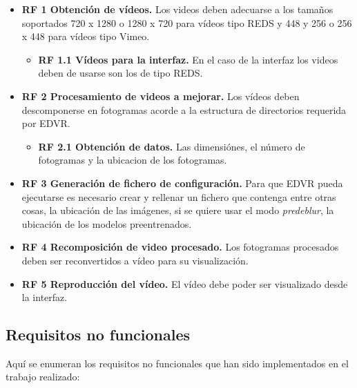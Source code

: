 \begin{itemize}

\item \textbf{RF 1 Obtención de vídeos.} Los videos deben adecuarse a los tamaños soportados 720 x 1280 o  1280 x  720 para vídeos tipo REDS y 448 y 256 o 256 x 448 para vídeos tipo Vimeo.
	\begin{itemize}
    \item \textbf{RF 1.1 Vídeos para la interfaz.} En el caso de la interfaz los videos deben de usarse son los de tipo REDS. 
    \end{itemize}

\item \textbf{RF 2 Procesamiento de videos a mejorar.} Los vídeos deben descomponerse en fotogramas acorde a la estructura de directorios requerida por EDVR.
	\begin{itemize}
    \item \textbf{RF 2.1 Obtención de datos.} Las dimensiónes, el número de fotogramas y la ubicacion de los fotogramas. 
    \end{itemize}

\item \textbf{RF 3 Generación de fichero de configuración.} Para que EDVR pueda ejecutarse es necesario crear y rellenar un fichero que contenga entre otras cosas, la ubicación de las imágenes, si se quiere usar el modo \emph{predeblur}, la ubicación de los modelos preentrenados.

\item \textbf{RF 4 Recomposición de video procesado.} Los fotogramas procesados deben ser reconvertidos a vídeo para su visualización.

\item \textbf{RF 5 Reproducción del vídeo.} El vídeo debe poder ser visualizado desde la interfaz.

\end{itemize}

\subsection{Requisitos no funcionales}

Aquí se enumeran los requisitos no funcionales que han sido implementados en el trabajo realizado:

